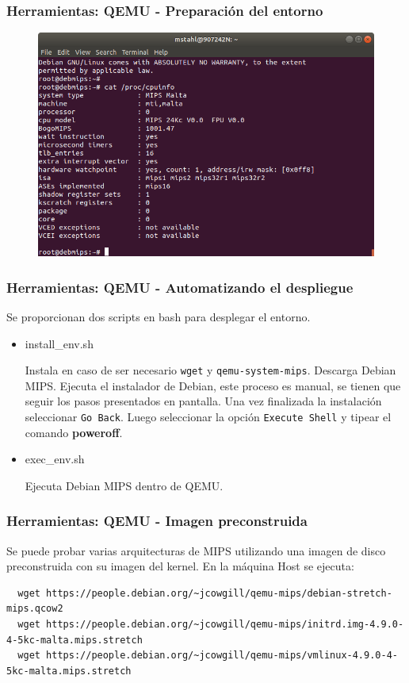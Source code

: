 \documentclass{beamer}
\begin{document}
    \begin{frame}[fragile]
 \frametitle{Herramientas: QEMU - Preparación del entorno} 
\begin{figure}[h!]
 \centering
 \includegraphics[scale=.4,keepaspectratio=true]{./gfx/DebianMips.png}
\end{figure} 
  \end{frame}

    \begin{frame}[fragile]
 \frametitle{Herramientas: QEMU - Automatizando el despliegue} 
Se proporcionan dos scripts en bash para desplegar el entorno.
\begin{itemize}
 \item install\_env.sh
 
 Instala en caso de ser necesario \texttt{wget} y \texttt{qemu-system-mips}. Descarga Debian MIPS. Ejecuta el instalador de Debian, este proceso es manual, se tienen que seguir los pasos presentados en pantalla. Una vez finalizada la instalación seleccionar \texttt{Go Back}. Luego seleccionar la opción \texttt{Execute Shell} y tipear el comando \textbf{poweroff}.
 \item exec\_env.sh
 
 Ejecuta Debian MIPS dentro de QEMU. 
 
\end{itemize}

  \end{frame}  
  

\begin{frame}[fragile]
 \frametitle{Herramientas: QEMU - Imagen preconstruida}
 Se puede probar varias arquitecturas de MIPS utilizando una imagen de disco preconstruida con su imagen del kernel. En la máquina Host se ejecuta:
 
 \begin{lstlisting}
  wget https://people.debian.org/~jcowgill/qemu-mips/debian-stretch-mips.qcow2
  wget https://people.debian.org/~jcowgill/qemu-mips/initrd.img-4.9.0-4-5kc-malta.mips.stretch
  wget https://people.debian.org/~jcowgill/qemu-mips/vmlinux-4.9.0-4-5kc-malta.mips.stretch
 \end{lstlisting}
\end{frame}  
\end{document}
